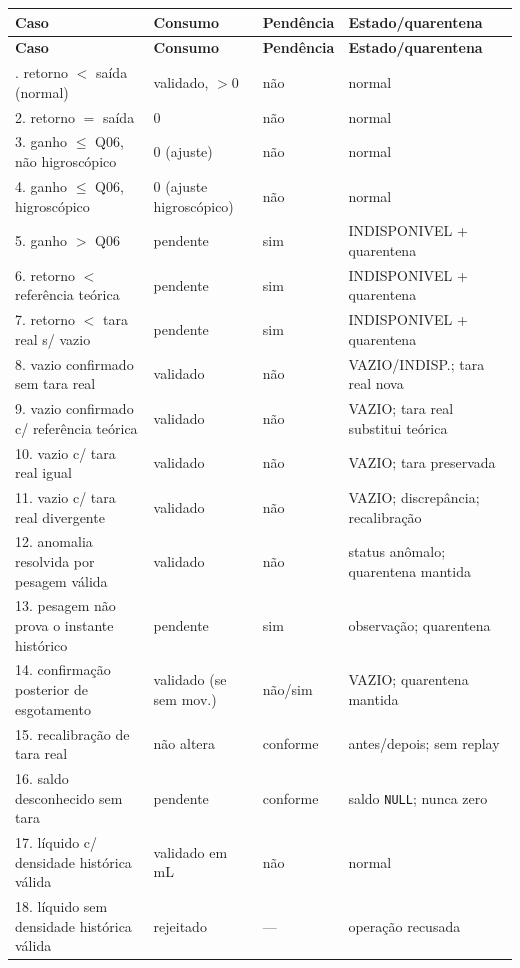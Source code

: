 \begin{longtable}{p{}p{}p{}p{}}
\toprule
\textbf{Caso} & \textbf{Consumo} & \textbf{Pendência} & \textbf{Estado/quarentena} \\
\midrule
\endfirsthead
\toprule
\textbf{Caso} & \textbf{Consumo} & \textbf{Pendência} & \textbf{Estado/quarentena} \\
\midrule
\endhead
\bottomrule
\endfoot
1. retorno $<$ saída (normal) & validado, $>0$ & não & normal \\
2. retorno $=$ saída & 0 & não & normal \\
3. ganho $\le$ Q06, não higroscópico & 0 (ajuste) & não & normal \\
4. ganho $\le$ Q06, higroscópico & 0 (ajuste higroscópico) & não & normal \\
5. ganho $>$ Q06 & pendente & sim & INDISPONIVEL + quarentena \\
6. retorno $<$ referência teórica & pendente & sim & INDISPONIVEL + quarentena \\
7. retorno $<$ tara real s/ vazio & pendente & sim & INDISPONIVEL + quarentena \\
8. vazio confirmado sem tara real & validado & não & VAZIO/INDISP.; tara real nova \\
9. vazio confirmado c/ referência teórica & validado & não & VAZIO; tara real substitui teórica \\
10. vazio c/ tara real igual & validado & não & VAZIO; tara preservada \\
11. vazio c/ tara real divergente & validado & não & VAZIO; discrepância; recalibração \\
12. anomalia resolvida por pesagem válida & validado & não & status anômalo; quarentena mantida \\
13. pesagem não prova o instante histórico & pendente & sim & observação; quarentena \\
14. confirmação posterior de esgotamento & validado (se sem mov.) & não/sim & VAZIO; quarentena mantida \\
15. recalibração de tara real & não altera & conforme & antes/depois; sem replay \\
16. saldo desconhecido sem tara & pendente & conforme & saldo \texttt{NULL}; nunca zero \\
17. líquido c/ densidade histórica válida & validado em mL & não & normal \\
18. líquido sem densidade histórica válida & rejeitado & --- & operação recusada \\

\end{longtable}
